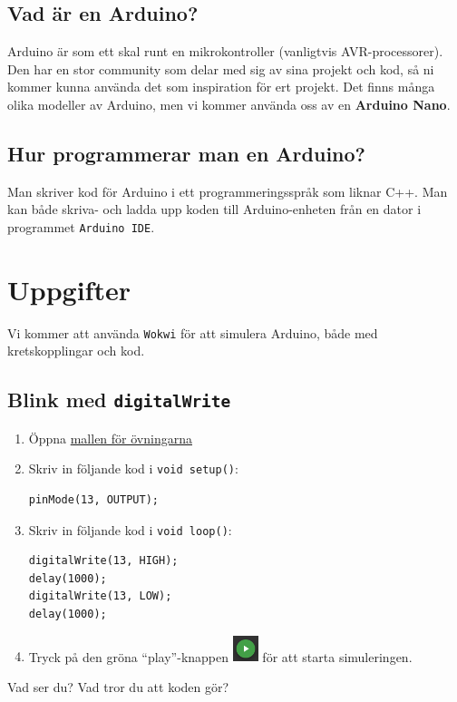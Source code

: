 \documentclass[11pt]{article}
\newcommand{\mallurl}{https://wokwi.com/projects/357812594927244289}
\begin{document}
\subsection{Vad är en Arduino?}
Arduino är som ett skal runt en mikrokontroller (vanligtvis AVR-processorer).
Den har en stor community som delar med sig av sina projekt och kod, så ni
kommer kunna använda det som inspiration för ert projekt. Det finns många olika
modeller av Arduino, men vi kommer använda oss av en \textbf{Arduino Nano}.

\subsection{Hur programmerar man en Arduino?}
Man skriver kod för Arduino i ett programmeringsspråk som liknar C++. Man kan
både skriva- och ladda upp koden till Arduino-enheten från en dator i
programmet \texttt{Arduino IDE}.

\newpage
\onehalfspacing
\section{Uppgifter}
Vi kommer att använda \texttt{Wokwi} för att simulera Arduino, både med
kretskopplingar och kod.
\subsection{Blink med \texttt{digitalWrite}}\label{sec:blink}
\begin{enumerate}
      \item
            Öppna \href{\mallurl}{mallen för övningarna}
      \item
            Skriv in följande kod i \texttt{void setup()}:

            \begin{lstlisting}
pinMode(13, OUTPUT);
       \end{lstlisting}
      \item
            Skriv in följande kod i \texttt{void loop()}:

            \begin{lstlisting}
digitalWrite(13, HIGH);
delay(1000);
digitalWrite(13, LOW);
delay(1000);
       \end{lstlisting}
      \item
            Tryck på den gröna ``play''-knappen
            \includegraphics[width=2em,valign=c]{play} för att starta
            simuleringen.
\end{enumerate}
\vspace{1em}
Vad ser du? Vad tror du att koden gör?
\end{document}
